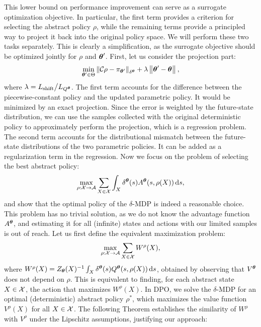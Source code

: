 \noindent This lower bound on performance improvement can serve as a surrogate optimization objective. In particular, the first term provides a criterion for selecting the abstract policy $\rho$, while the remaining terms provide a principled way to project it back into the original policy space. 
We will perform these two tasks separately. This is clearly a simplification, as the surrogate objective should be optimized jointly for $\rho$ and $\vtheta'$. 
First, let us consider the projection part: 
\begin{align}\label{eq:proj}
\min_{\vtheta'\in\Theta} \norm[\delta^{\vtheta}]{\Conc\rho - \pi_{\vtheta'}} 
+ \lambda\norm{\vtheta'-\vtheta},
\end{align}
where $\lambda=L_{\text{shift}}\big/L_{Q^{\vtheta}}$. The first term accounts for the difference between the piecewise-constant policy and the updated parametric policy. It would be minimized by an exact projection. Since the error is weighted by the future-state distribution, we can use the samples collected with the original deterministic policy to approximately perform the projection, which is a regression problem. The second term accounts for the distributional mismatch between the future-state distributions of the two parametric policies. It can be added as a regularization term in the regression.
%
Now we focus on the problem of selecting the best abstract policy: 
%
\begin{align}
\max_{\rho:\Xspace\to\Aspace}\sum_{X\in\Xspace}\int_{X}\delta^{\vtheta}(s)A^{\vtheta}(s,\rho(X)) \de s,
\end{align}
%
and show that the optimal policy of the $\delta$-\ac{MDP} is indeed a reasonable choice. This problem has no trivial solution, as we do not know the advantage function $A^{\vtheta}$, and estimating it for all (infinite) states and actions with our limited samples is out of reach. Let us first define the equivalent maximization problem:
\begin{align}\label{eq:W}
\max_{\rho:\Xspace\to\Aspace} \sum_{X\in\Xspace}W^{\rho}(X),
\end{align}
where $W^{\rho}(X) = Z_{\vtheta}(X)^{-1}\int_{X}\delta^{\vtheta}(s)Q^{\vtheta}(s,\rho(X))\de s$, obtained by observing that $V^{\vtheta}$ does not depend on $\rho$. This is equivalent to finding, for each abstract state $X\in\Xspace$, the action that maximizes $W^{\rho}(X)$. In \ac{DPO}, we solve the $\delta$-\ac{MDP} for an optimal (deterministic) abstract policy $\rho^{*}$, which maximizes the value function $V^{\rho}(X)$ for all $X\in\Xspace$. The following Theorem establishes the similarity of $W^{\rho}$ with $V^{\rho}$ under the Lipschitz assumptions, justifying our approach:
